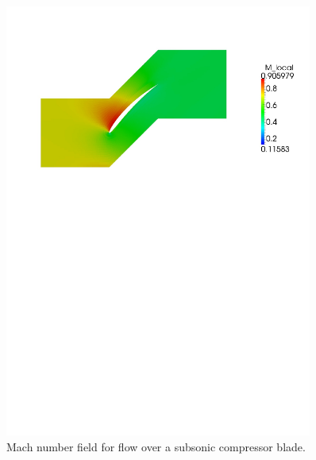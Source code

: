 \begin{figure}[htbp]
\begin{center}
\includegraphics[width=0.9\textwidth,viewport=24 495 570 817]{../2D/turbo_sc10_parametric/mach-field.pdf}
\end{center}
\caption{Mach number field for flow over a subsonic compressor blade.}
\label{turbo-sc10-parametric-mach-fig}
\end{figure}

